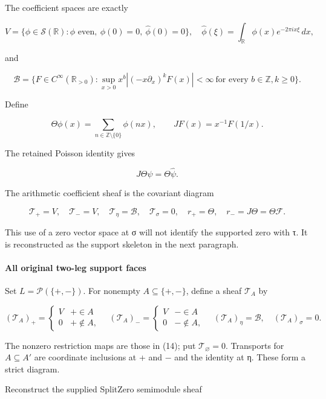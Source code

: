 The coefficient spaces are exactly

\[
V=\{\phi\in\mathcal S(\mathbb R):\phi\text{ even},\ \phi(0)=0,\ \widehat\phi(0)=0\},
\quad
\widehat\phi(\xi)=\int_{\mathbb R}\phi(x)e^{-2\pi i x\xi}\,dx,
\tag{10}
\]

and

\[
\mathscr B=\{F\in C^\infty(\mathbb R_{>0}):
\sup_{x>0}x^b|(-x\partial_x)^kF(x)|<\infty
\ \text{for every }b\in\mathbb Z,k\ge0\}.
\tag{11}
\]

Define

\[
\Theta\phi(x)=\sum_{n\in\mathbb Z\setminus\{0\}}\phi(nx),
\qquad JF(x)=x^{-1}F(1/x).
\tag{12}
\]

The retained Poisson identity gives

\[
J\Theta\psi=\Theta\widehat\psi.
\tag{13}
\]

The arithmetic coefficient sheaf is the covariant diagram

\[
\mathcal T_+=V,\quad\mathcal T_-=V,\quad
\mathcal T_\eta=\mathscr B,\quad\mathcal T_\sigma=0,
\quad r_+=\Theta,\quad r_-=J\Theta=\Theta\mathcal F.
\tag{14}
\]

This use of a zero vector space at σ will not identify the supported zero with τ. It is reconstructed as the support skeleton in the next paragraph.

\paragraph{All original two-leg support faces}\label{endpoint-tau_base--all-original-two-leg-support-faces}

Set \(L=\mathcal P(\{+,-\})\). For nonempty \(A\subseteq\{+,-\}\), define a sheaf \(\mathcal T_A\) by

\[
(\mathcal T_A)_+=\begin{cases}V&+\in A\\0&+\notin A,\end{cases}
\quad
(\mathcal T_A)_-=\begin{cases}V&-\in A\\0&-\notin A,\end{cases}
\quad
(\mathcal T_A)_\eta=\mathscr B,\quad
(\mathcal T_A)_\sigma=0.
\tag{15}
\]

The nonzero restriction maps are those in (14); put \(\mathcal T_\varnothing=0\). Transports for \(A\subseteq A'\) are coordinate inclusions at + and − and the identity at η. These form a strict diagram.

Reconstruct the supplied SplitZero semimodule sheaf

